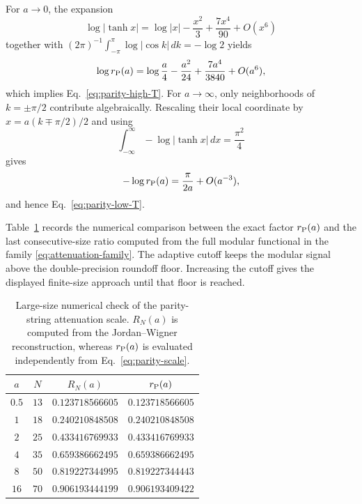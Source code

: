 \documentclass[11pt]{article}
\newenvironment{ruledtabular}{}{}
\begin{document}
For $a\to0$, the expansion
\begin{equation}
 \log|\tanh x|
 =\log|x|-\frac{x^2}{3}+\frac{7x^4}{90}+O(x^6)
 \label{eq:log-tanh-small}
\end{equation}
together with
$(2\pi)^{-1}\int_{-\pi}^{\pi}\log|\cos k|\,dk=-\log2$ yields
\begin{equation}
 \log r_{\rm P}(a)
 =\log\frac a4-\frac{a^2}{24}
 +\frac{7a^4}{3840}+O(a^6),
 \label{eq:parity-high-T-log}
\end{equation}
which implies Eq.~\eqref{eq:parity-high-T}.  For $a\to\infty$, only
neighborhoods of $k=\pm\pi/2$ contribute algebraically.  Rescaling their
local coordinate by $x=a(k\mp\pi/2)/2$ and using
\begin{equation}
 \int_{-\infty}^{\infty}-\log|\tanh x|\,dx=\frac{\pi^2}{4}
 \label{eq:tanh-integral}
\end{equation}
gives
\begin{equation}
 -\log r_{\rm P}(a)=\frac{\pi}{2a}+O(a^{-3}),
 \label{eq:parity-low-T-log}
\end{equation}
and hence Eq.~\eqref{eq:parity-low-T}.

Table~\ref{tab:attenuation-check} records the numerical comparison between
the exact factor $r_{\rm P}(a)$ and the last consecutive-size ratio computed
from the full modular functional in the family
\eqref{eq:attenuation-family}.  The adaptive cutoff keeps the modular signal
above the double-precision roundoff floor.  Increasing the cutoff gives the
displayed finite-size approach until that floor is reached.

\begin{table}[t]
\caption{Large-size numerical check of the parity-string attenuation scale.
$R_N(a)$ is computed from the Jordan--Wigner reconstruction, whereas
$r_{\rm P}(a)$ is evaluated independently from
Eq.~\eqref{eq:parity-scale}.}
\label{tab:attenuation-check}
\begin{ruledtabular}
\begin{tabular}{cccc}
$a$ & $N$ & $R_N(a)$ & $r_{\rm P}(a)$\\
\hline
$0.5$ & $13$ & $0.123718566605$ & $0.123718566605$\\
$1$   & $18$ & $0.240210848508$ & $0.240210848508$\\
$2$   & $25$ & $0.433416769933$ & $0.433416769933$\\
$4$   & $35$ & $0.659386662495$ & $0.659386662495$\\
$8$   & $50$ & $0.819227344995$ & $0.819227344443$\\
$16$  & $70$ & $0.906193444199$ & $0.906193409422$\\
\end{tabular}
\end{ruledtabular}
\end{table}
\end{document}
